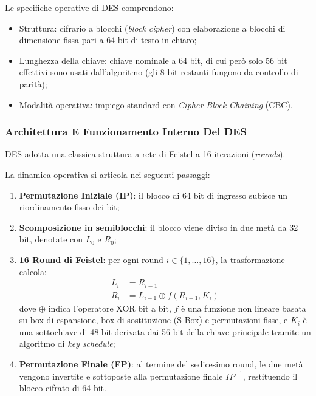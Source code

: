 \documentclass[11pt, a4paper]{article}
\begin{document}
Le specifiche operative di DES comprendono:
\begin{itemize}[noitemsep]
    \item Struttura: cifrario a blocchi (\emph{block cipher}) con elaborazione a blocchi di dimensione fissa pari a 64 bit di testo in chiaro;
    \item Lunghezza della chiave: chiave nominale a 64 bit, di cui però solo 56 bit effettivi sono usati dall'algoritmo (gli 8 bit restanti fungono da controllo di parità);
    \item Modalità operativa: impiego standard con \emph{Cipher Block Chaining} (CBC).
\end{itemize}

\subsubsection{Architettura E Funzionamento Interno Del DES}
DES adotta una classica struttura a rete di Feistel a 16 iterazioni (\emph{rounds}).


La dinamica operativa si articola nei seguenti passaggi:
\begin{enumerate}[leftmargin=*]
    \item \textbf{Permutazione Iniziale (IP)}: il blocco di 64 bit di ingresso subisce un riordinamento fisso dei bit;
    \item \textbf{Scomposizione in semiblocchi}: il blocco viene diviso in due metà da 32 bit, denotate con $L_0$ e $R_0$;
    \item \textbf{16 Round di Feistel}: per ogni round $i \in \{1, \dots, 16\}$, la trasformazione calcola:
    \begin{align*}
        L_i &= R_{i-1} \\
        R_i &= L_{i-1} \oplus f(R_{i-1}, K_i)
    \end{align*}
    dove $\oplus$ indica l'operatore XOR bit a bit, $f$ è una funzione non lineare basata su box di espansione, box di sostituzione (S-Box) e permutazioni fisse, e $K_i$ è una sottochiave di 48 bit derivata dai 56 bit della chiave principale tramite un algoritmo di \emph{key schedule};
    \item \textbf{Permutazione Finale (FP)}: al termine del sedicesimo round, le due metà vengono invertite e sottoposte alla permutazione finale $IP^{-1}$, restituendo il blocco cifrato di 64 bit.
\end{enumerate}
\end{document}
